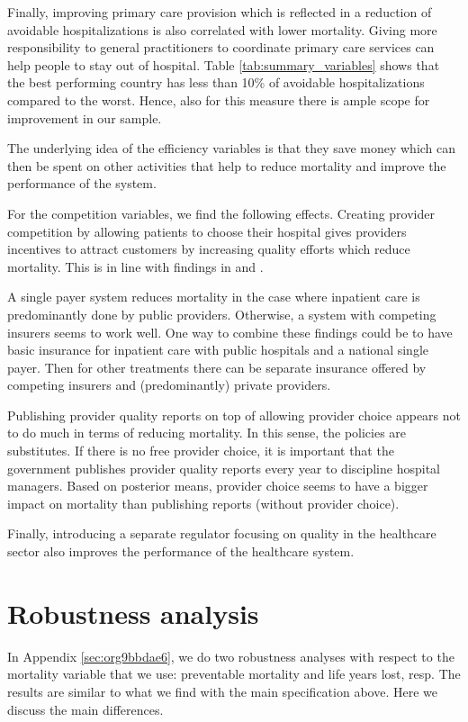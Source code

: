 \documentclass[a4paper,12pt]{article}
\begin{document}
Finally, improving primary care provision which is reflected in a reduction of avoidable hospitalizations is also correlated with lower mortality. Giving more responsibility to general practitioners to coordinate primary care services can help people to stay out of hospital. Table \ref{tab:summary_variables} shows that the best performing country has less than 10\% of avoidable hospitalizations compared to the worst. Hence, also for this measure there is ample scope for improvement in our sample. 

The underlying idea of the efficiency variables is that they save money which can then be spent on other activities that help to reduce mortality and improve the performance of the system.

For the competition variables, we find the following effects. Creating provider competition by allowing patients to choose their hospital gives providers incentives to attract customers by increasing quality efforts which reduce mortality. This is in line with findings in \cite{NBERw19800} and \cite{teisberg}.

A single payer system reduces mortality in the case where inpatient care is predominantly done by public providers. Otherwise, a system with competing insurers seems to work well. One way to combine these findings could be to have basic insurance for inpatient care with public hospitals and a national single payer. Then for other treatments there can be separate insurance offered by competing insurers and (predominantly) private providers.

Publishing provider quality reports on top of allowing provider choice appears not to do much in terms of reducing mortality. In this sense, the policies are substitutes. If there is no free provider choice, it is important that the government publishes provider quality reports every year to discipline hospital managers. Based on posterior means, provider choice seems to have a bigger impact on mortality than publishing reports (without provider choice).

Finally, introducing a separate regulator focusing on quality in the healthcare sector also improves the performance of the healthcare system.

\section{Robustness analysis}
\label{sec:org8a0675c}

In Appendix \ref{sec:org9bbdae6}, we do two robustness analyses with respect to the mortality variable that we use: preventable mortality and  life years lost, resp. The results are similar to what we find with the main specification above. Here we discuss the main differences.
\end{document}
